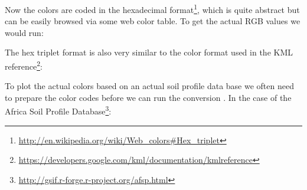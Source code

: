 \documentclass[11pt]{krantz}
\newenvironment{Shaded}{\begin{snugshade}}{\end{snugshade}}
\newcommand{\CommentTok}[1]{\textcolor[rgb]{0.37,0.37,0.37}{\textit{#1}}}
\newcommand{\DataTypeTok}[1]{\textcolor[rgb]{0.27,0.27,0.27}{#1}}
\newcommand{\DecValTok}[1]{\textcolor[rgb]{0.06,0.06,0.06}{#1}}
\newcommand{\KeywordTok}[1]{\textcolor[rgb]{0.27,0.27,0.27}{\textbf{#1}}}
\newcommand{\NormalTok}[1]{#1}
\newcommand{\OperatorTok}[1]{\textcolor[rgb]{0.43,0.43,0.43}{\textbf{#1}}}
\newcommand{\StringTok}[1]{\textcolor[rgb]{0.5,0.5,0.5}{#1}}
\renewcommand{\href}[2]{#2\footnote{\url{#1}}}
\theoremstyle{definition}
\theoremstyle{definition}
\theoremstyle{definition}
\theoremstyle{remark}
\begin{document}
\begin{Shaded}
\end{Shaded}

Now the colors are coded in the
\href{http://en.wikipedia.org/wiki/Web_colors\#Hex_triplet}{hexadecimal
format}, which is quite abstract but can be easily browsed via some web
color table. To get the actual RGB values we would run:

\begin{Shaded}
\end{Shaded}

The hex triplet format is also very similar to the color format used in
the
\href{https://developers.google.com/kml/documentation/kmlreference}{KML
reference}:

\begin{Shaded}
\end{Shaded}

To plot the actual colors based on an actual soil profile data base we
often need to prepare the color codes before we can run the conversion
\citep{VISCARRAROSSEL2006320}. In the case of the
\href{http://gsif.r-forge.r-project.org/afsp.html}{Africa Soil Profile
Database}:

\begin{Shaded}
\end{Shaded}
\end{document}
